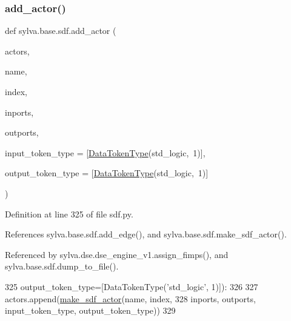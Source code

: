 \subsubsection{\texorpdfstring{add\+\_\+actor()}{add\_actor()}}
{\footnotesize\ttfamily def sylva.\+base.\+sdf.\+add\+\_\+actor (\begin{DoxyParamCaption}\item[{}]{actors,  }\item[{}]{name,  }\item[{}]{index,  }\item[{}]{inports,  }\item[{}]{outports,  }\item[{}]{input\+\_\+token\+\_\+type = {\ttfamily \mbox{[}\hyperlink{classsylva_1_1base_1_1sdf_1_1_data_token_type}{Data\+Token\+Type}(\textquotesingle{}std\+\_\+logic\textquotesingle{},~1)\mbox{]}},  }\item[{}]{output\+\_\+token\+\_\+type = {\ttfamily \mbox{[}\hyperlink{classsylva_1_1base_1_1sdf_1_1_data_token_type}{Data\+Token\+Type}(\textquotesingle{}std\+\_\+logic\textquotesingle{},~1)\mbox{]}} }\end{DoxyParamCaption})}



Definition at line 325 of file sdf.\+py.



References sylva.\+base.\+sdf.\+add\+\_\+edge(), and sylva.\+base.\+sdf.\+make\+\_\+sdf\+\_\+actor().



Referenced by sylva.\+dse.\+dse\+\_\+engine\+\_\+v1.\+assign\+\_\+fimps(), and sylva.\+base.\+sdf.\+dump\+\_\+to\+\_\+file().


\begin{DoxyCode}
325                   output\_token\_type=[DataTokenType(\textcolor{stringliteral}{'std\_logic'}, 1)]):
326 
327         actors.append(\hyperlink{namespacesylva_1_1base_1_1sdf_a34a38a5853d86a6e49aba53f9040462d}{make\_sdf\_actor}(name, index,
328                                      inports, outports, input\_token\_type, output\_token\_type))
329 
\end{DoxyCode}
\mbox{\label{namespacesylva_1_1base_1_1sdf_aecda5e2c5810b35f98a0466a348af120}} 
